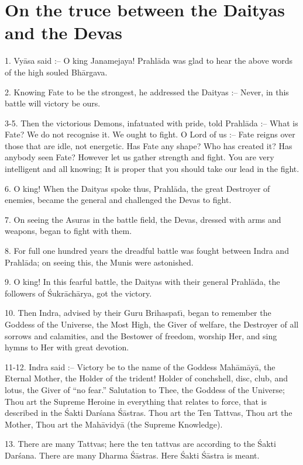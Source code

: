 \chapter{On the truce between the Daityas and the Devas}

1. Vy\=asa said :-- O king Janamejaya! Prahl\=ada was glad to hear the above words of the high souled Bh\=argava.

2. Knowing Fate to be the strongest, he addressed the Daityas :-- Never, in this battle will victory be ours.

3-5. Then the victorious Demons, infatuated with pride, told Prahl\=ada :-- What is Fate? We do not recognise it. We ought to fight. O Lord of us :-- Fate reigns over those that are idle, not energetic. Has Fate any shape? Who has created it? Has anybody seen Fate? However let us gather strength and fight. You are very intelligent and all knowing; It is proper that you should take our lead in the fight.

6. O king! When the Daityas spoke thus, Prahl\=ada, the great Destroyer of enemies, became the general and challenged the Devas to fight.

7. On seeing the Asuras in the battle field, the Devas, dressed with arms and weapons, began to fight with them.

8. For full one hundred years the dreadful battle was fought between Indra and Prahl\=ada; on seeing this, the Munis were astonished.

9. O king! In this fearful battle, the Daityas with their general Prahl\=ada, the followers of \'Sukr\=ach\=arya, got the victory.

10. Then Indra, advised by their Guru Brihaspat\={\i}, began to remember the Goddess of the Universe, the Most High, the Giver of welfare, the Destroyer of all sorrows and calamities, and the Bestower of freedom, worship Her, and sing hymns to Her with great devotion.

11-12. Indra said :-- Victory be to the name of the Goddess Mah\=am\=ay\=a, the Eternal Mother, the Holder of the trident! Holder of conchshell, disc, club, and lotus, the Giver of ``no fear.'' Salutation to Thee, the Goddess of the Universe; Thou art the Supreme Heroine in everything that relates to force, that is described in the \'Sakti Dar\'sana \'S\=astras. Thou art the Ten Tattvas, Thou art the Mother, Thou art the Mah\=avidy\=a (the Supreme Knowledge).

13. There are many Tattvas; here the ten tattvas are according to the \'Sakti Dar\'sana. There are many Dharma \'S\=astras. Here \'Sakti \'S\=astra is meant.

